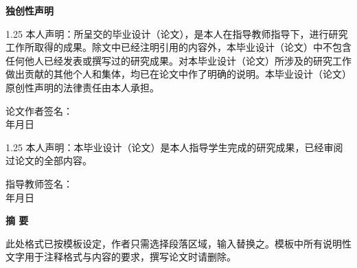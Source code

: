 

\newpage
\pagestyle{empty}
\begin{center}
    \vspace*{1em}
    \bfseries 独创性声明
    \vspace{1em}
\end{center}

\begin{spacing}{1.25}\fontsize{16pt}{20pt}\selectfont
    本人声明：所呈交的毕业设计（论文），是本人在指导教师指导下，进行研究工作所取得的成果。除文中已经注明引用的内容外，本毕业设计（论文）中不包含任何他人已经发表或撰写过的研究成果。对本毕业设计（论文）所涉及的研究工作做出贡献的其他个人和集体，均已在论文中作了明确的说明。本毕业设计（论文）原创性声明的法律责任由本人承担。
\end{spacing}

\vspace{2em}

\begin{center}
    \hfill\fontsize{16pt}{16pt}\selectfont 论文作者签名：\qquad\qquad\qquad\qquad\qquad\quad
    \\
    \hfill 年\quad\quad 月\quad\quad 日
    \vspace{2em}
\end{center}

\begin{spacing}{1.25}\fontsize{16pt}{20pt}\selectfont
本人声明：本毕业设计（论文）是本人指导学生完成的研究成果，已经审阅过论文的全部内容。
\end{spacing}

\vspace{1em}

\begin{center}
    \hfill\fontsize{16pt}{16pt}\selectfont 指导教师签名：\qquad\qquad\qquad\qquad\qquad\quad
    \\
    \hfill 年\quad\quad 月\quad\quad 日
\end{center}

\newpage
\pagestyle{pre}
\begin{center}
    \bfseries 摘 \quad 要
    \vspace{0.8em}
\end{center}

\fontsize{14pt}{16pt}\selectfont
此处格式已按模板设定，作者只需选择段落区域，输入替换之。模板中所有说明性文字用于注释格式与内容的要求，撰写论文时请删除。

